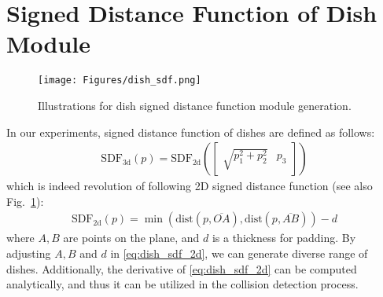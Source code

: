 \documentclass[lettersize,journal]{IEEEtran}
\begin{document}
\section{Signed Distance Function of Dish Module} \label{appendix:dish_sdf}

\begin{figure}[t]
\centering
\texttt{[image: Figures/dish\_sdf.png]}
\caption{Illustrations for dish signed distance function module generation.}
\label{fig:dish_sdf}
\end{figure}

In our experiments, signed distance function of dishes are defined as follows:
\begin{align*}
    \text{SDF}_{\text{3d}}(p) = \text{SDF}_{\text{2d}}\left(\begin{bmatrix}
        \sqrt{p_1^2+p_2^2} & p_3
    \end{bmatrix}\right)
\end{align*}
which is indeed revolution of following 2D signed distance function (see also Fig.~\ref{fig:dish_sdf}):
\begin{align} \label{eq:dish_sdf_2d}
    \text{SDF}_{\text{2d}}(p) = \min\left(\text{dist}(p,\overline{OA}),\text{dist}(p,\overline{AB})\right)-d
\end{align}
where $A,B$ are points on the plane, and $d$ is a thickness for padding.
By adjusting $A,B$ and $d$ in \eqref{eq:dish_sdf_2d}, we can generate diverse range of dishes.
Additionally, the derivative of \eqref{eq:dish_sdf_2d} can be computed analytically, and thus it can be utilized in the collision detection process. 





\end{document}
